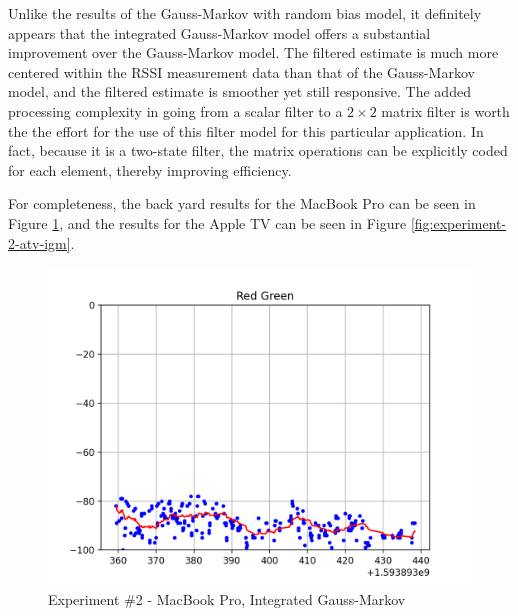 \documentclass[12pt]{article}
\begin{document}
Unlike the results of the Gauss-Markov with random bias model, it definitely appears that
the integrated Gauss-Markov model offers a substantial improvement over the Gauss-Markov
model. The filtered estimate is much more centered within the RSSI measurement data than
that of the Gauss-Markov model, and the filtered estimate is smoother yet still responsive.
The added processing complexity in going from a scalar filter to a $2 \times 2$ matrix
filter is worth the the effort for the use of this filter model for this particular
application. In fact, because it is a two-state filter, the matrix operations can be
explicitly coded for each element, thereby improving efficiency.

For completeness, the back yard results for the MacBook Pro can be seen in Figure
\ref{fig:experiment-2-mbp-igm}, and the results for the Apple TV can be seen in Figure
\ref{fig:experiment-2-atv-igm}.

\begin{figure}[ht]
    \centering
    \includegraphics[width=1.0\textwidth]{Experiment-2-MBP-IGM.png}
    \caption{Experiment \#2 - MacBook Pro, Integrated Gauss-Markov}
    \label{fig:experiment-2-mbp-igm}
\end{figure}
\end{document}
